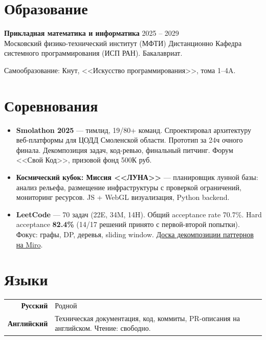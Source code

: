 \documentclass[10pt, a4paper]{article}
\newcommand{\entry}[4]{{\textbf{#1}} \hfill {\small\color{graytext}#2}\\{\small #3 \hfill #4}\vspace{2pt}}
\begin{document}
\vspace{-2pt}

\section{Образование}

\entry{Прикладная математика и информатика}{2025 -- 2029}{Московский физико-технический институт (МФТИ)}{Дистанционно}
{\small Кафедра системного программирования (ИСП РАН). Бакалавриат.}

{\small Самообразование: Кнут, <<Искусство программирования>>, тома 1--4A.}

\vspace{-2pt}

\section{Соревнования}

\begin{itemize}
\item \textbf{Smolathon 2025} --- тимлид, 19/80+ команд. Спроектировал архитектуру веб-платформы для ЦОДД Смоленской области. Прототип за 24ч очного финала. Декомпозиция задач, код-ревью, финальный питчинг. Форум <<Свой Код>>, призовой фонд 500К руб.
\item \textbf{Космический кубок: Миссия <<ЛУНА>>} --- планировщик лунной базы: анализ рельефа, размещение инфраструктуры с проверкой ограничений, мониторинг ресурсов. JS + WebGL визуализация, Python backend.
\item \textbf{LeetCode} --- 70 задач (22E, 34M, 14H). Общий acceptance rate 70.7\%. Hard acceptance \textbf{82.4\%} (14/17 решений принято с первой-второй попытки). Фокус: графы, DP, деревья, sliding window. \href{https://miro.com/app/board/uXjVGcc9d58=/?share_link_id=838442415695}{Доска декомпозиции паттернов на Miro}.
\end{itemize}

\vspace{-2pt}

\section{Языки}

\begin{tabularx}{\textwidth}{@{}r|X@{}}
\textbf{\small Русский} & Родной \\
\textbf{\small Английский} & Техническая документация, код, коммиты, PR-описания на английском. Чтение: свободно. \\
\end{tabularx}
\end{document}
